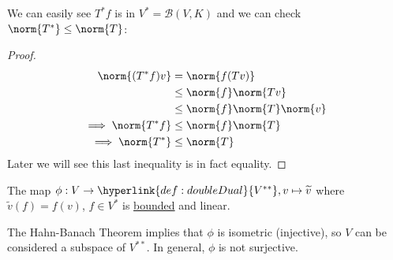 \documentclass{article}
\begin{document}

\begin{fact}
    We can easily see $T^* f$ is in $V^* = \mathcal{B}(V, K)$ and we can check $\norm{T^*} \leq \norm{T}$:
\end{fact}

\begin{proof}
    \begin{align*}
        \norm{(T^* f) v} &= \norm{f(T v)} \\
                         &\leq \norm{f} \norm{Tv} \\
                         &\leq \norm{f} \norm{T} \norm{v} \\
        \implies \norm{T^* f} &\leq \norm{f} \norm{T} \\
        \implies \norm{T^*} &\leq \norm{T} \\
    \end{align*}
    \hypertarget{pf:dualMapNorm}{Later} we will see this last inequality is in fact equality.
\end{proof}



\begin{fact}
    The map $\phi: V \to \hyperlink{def:doubleDual}{V^{**}}, v \mapsto \widetilde v$ where $\widetilde v(f) = f(v)$, $f \in V^*$ is \hyperlink{def:boundedLinearMap}{bounded} and linear.
\end{fact}

\begin{remark}
    The Hahn-Banach Theorem implies that $\phi$ is isometric (injective), so $V$ can be considered a subspace of $V^{**}$. In general, $\phi$ is not surjective.
\end{remark}
\end{document}
